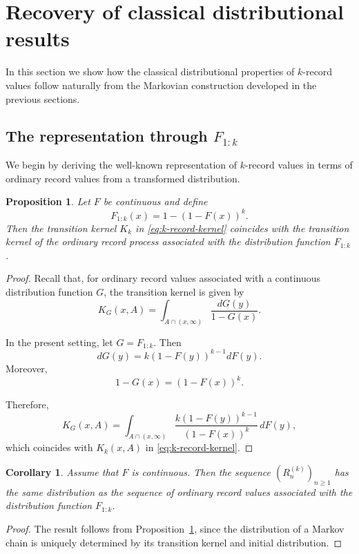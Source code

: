 \documentclass[12pt]{article}
\newtheorem{proposition}[theorem]{Proposition}
\newtheorem{corollary}[theorem]{Corollary}
\theoremstyle{definition}
\begin{document}
\section{Recovery of classical distributional results}
\label{sec:classical-results}

In this section we show how the classical distributional properties of $k$-record values follow naturally from the Markovian construction developed in the previous sections.

\subsection{The representation through $F_{1:k}$}
\label{subsec:F1k-representation}

We begin by deriving the well-known representation of $k$-record values in terms of ordinary record values from a transformed distribution.

\begin{proposition}
\label{prop:F1k-kernel}
Let $F$ be continuous and define
\[
F_{1:k}(x)=1-(1-F(x))^k.
\]
Then the transition kernel $K_k$ in \eqref{eq:k-record-kernel} coincides with the transition kernel of the ordinary record process associated with the distribution function $F_{1:k}$.
\end{proposition}

\begin{proof}
Recall that, for ordinary record values associated with a continuous distribution function $G$, the transition kernel is given by
\[
K_G(x,A)
=
\int_{A\cap(x,\infty)}
\frac{dG(y)}{1-G(x)}.
\]

In the present setting, let $G=F_{1:k}$. Then
\[
dG(y)
=
k(1-F(y))^{k-1} dF(y).
\]
Moreover,
\[
1-G(x)
=
(1-F(x))^k.
\]

Therefore,
\[
K_G(x,A)
=
\int_{A\cap(x,\infty)}
\frac{k(1-F(y))^{k-1}}{(1-F(x))^k}\, dF(y),
\]
which coincides with $K_k(x,A)$ in \eqref{eq:k-record-kernel}.
\end{proof}

\begin{corollary}
\label{cor:F1k-representation}
Assume that $F$ is continuous. Then the sequence $(R_n^{(k)})_{n\ge1}$ has the same distribution as the sequence of ordinary record values associated with the distribution function $F_{1:k}$.
\end{corollary}

\begin{proof}
The result follows from Proposition~\ref{prop:F1k-kernel}, since the distribution of a Markov chain is uniquely determined by its transition kernel and initial distribution.
\end{proof}
\end{document}
